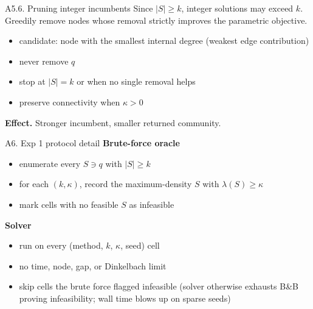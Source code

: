 \documentclass{beamer}
\begin{document}
\begin{frame}{A5.6. Pruning integer incumbents}
  Since $|S| \ge k$, integer solutions may exceed $k$. Greedily remove nodes whose removal strictly improves the parametric objective.

  \vfill

  \begin{itemize}
    \item candidate: node with the smallest internal degree (weakest edge contribution)
    \item never remove $q$
    \item stop at $|S| = k$ or when no single removal helps
    \item preserve connectivity when $\kappa > 0$
  \end{itemize}

  \vfill

  \textbf{Effect.} Stronger incumbent, smaller returned community.
\end{frame}

\begin{frame}{A6. Exp 1 protocol detail}
  \textbf{Brute-force oracle}
  \begin{itemize}
    \item enumerate every $S \ni q$ with $|S| \ge k$
    \item for each $(k, \kappa)$, record the maximum-density $S$ with $\lambda(S) \ge \kappa$
    \item mark cells with no feasible $S$ as infeasible
  \end{itemize}

  \vfill

  \textbf{Solver}
  \begin{itemize}
    \item run on every (method, $k$, $\kappa$, seed) cell
    \item no time, node, gap, or Dinkelbach limit
    \item skip cells the brute force flagged infeasible (solver otherwise exhausts B\&B proving infeasibility; wall time blows up on sparse seeds)
  \end{itemize}
\end{frame}
\end{document}
